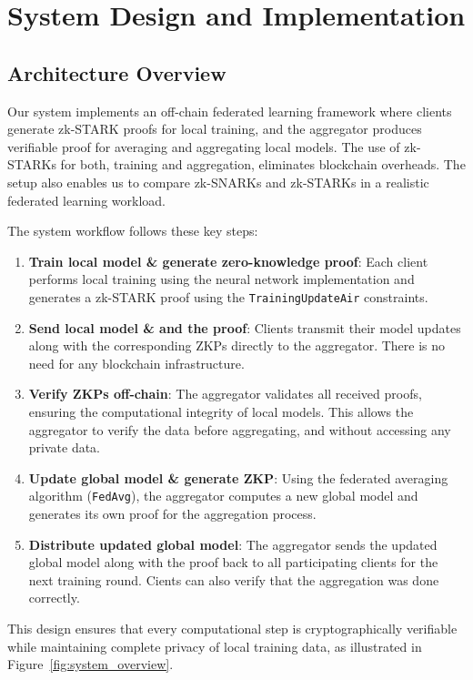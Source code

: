 \documentclass[runningheads]{llncs}
\begin{document}
\section{System Design and Implementation}

\subsection{Architecture Overview}
Our system implements an off-chain federated learning framework where clients generate zk-STARK proofs for local training, and the aggregator produces verifiable proof for averaging and aggregating local models. The use of zk-STARKs for both, training and aggregation, eliminates blockchain overheads.
The setup also enables us to compare zk-SNARKs and zk-STARKs in a realistic federated learning workload. 

The system workflow follows these key steps:
\begin{enumerate}
\item \textbf{Train local model \& generate zero-knowledge proof}: Each client performs local training using the neural network implementation and generates a zk-STARK proof using the {\tt TrainingUpdateAir} constraints.
\item \textbf{Send local model \& and the proof}: Clients transmit their model updates along with the corresponding ZKPs directly to the aggregator. There is no need for any blockchain infrastructure.
\item \textbf{Verify ZKPs off-chain}: The aggregator validates all received proofs, ensuring the computational integrity of local models. This allows the aggregator to verify the data before aggregating, and without accessing any private data.
\item \textbf{Update global model \& generate ZKP}: Using the federated averaging algorithm ({\tt FedAvg}), the aggregator computes a new global model and generates its own proof for the aggregation process.
\item \textbf{Distribute updated global model}: The aggregator sends the updated global model along with the proof back to all participating clients for the next training round.
Cients can also verify that the aggregation was done correctly. 
\end{enumerate}

This design ensures that every computational step is cryptographically verifiable while maintaining complete privacy of local training data, as illustrated in Figure~\ref{fig:system_overview}.
\end{document}
